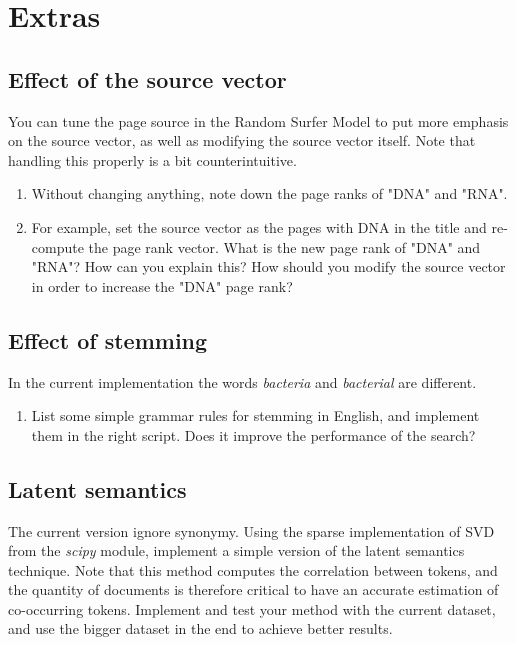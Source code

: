 \documentclass[mathserif, 11pt,c]{article}
\begin{document}
\section{Extras}

\subsection{Effect of the source vector}
You can tune the page source in the Random Surfer Model to put more emphasis on the source vector, as well as modifying the source vector itself.
Note that handling this properly is a bit counterintuitive.


\begin{enumerate}[label=\textbf{Q\thesection.\arabic*}]
	\item Without changing anything, note down the page ranks of "DNA" and "RNA".
	\item For example, set the source vector as the pages with DNA in the title and re-compute the page rank vector. What is the new page rank of "DNA" and "RNA"? How can you explain this? How should you modify the source vector in order to increase the "DNA" page rank?
\end{enumerate}

\subsection{Effect of stemming}	

In the current implementation the words \textit{bacteria} and \textit{bacterial} are different. 
\begin{enumerate}[label=\textbf{Q\thesection.\arabic*}]
	\item List some simple grammar rules for stemming in English, and implement them in the right script. Does it improve the performance of the search?
\end{enumerate}

\subsection{Latent semantics}

The current version ignore synonymy. Using the sparse implementation of SVD from the \textit{scipy} module, implement a simple version of the latent semantics technique. Note that this method computes the correlation between tokens, and the quantity of documents is therefore critical to have an accurate estimation of co-occurring tokens. Implement and test your method with the current dataset, and use the bigger dataset in the end to achieve better results.



%
\end{document}
